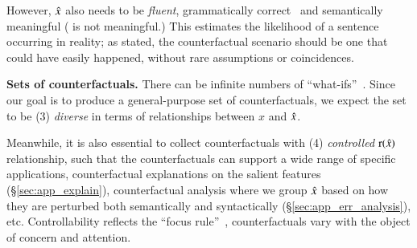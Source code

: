 However, $\hat{x}$ also needs to be \emph{fluent}, \ie grammatically correct~\cite{morris2020textattack} and semantically meaningful (\eg {} is not meaningful.)
This estimates the likelihood of a sentence occurring in reality; as \citet{kahneman} stated, the counterfactual scenario should be one that could have easily happened, without rare assumptions or coincidences. 



\textbf{Sets of counterfactuals.} There can be infinite numbers of ``what-ifs''~\cite{pearl2018causal, kahneman}. %
Since our goal is to produce a general-purpose set of counterfactuals, we expect the set to be (3) \emph{diverse} in terms of relationships between $x$ and $\hat{x}$.

Meanwhile, it is also essential to collect counterfactuals with (4) \emph{controlled} $\operatorname*{r}(\hat{x})$ relationship, such that the counterfactuals can support a wide range of specific applications, \eg counterfactual explanations on the salient features (\S\ref{sec:app_explain}), counterfactual analysis where we group $\hat{x}$ based on how they are perturbed both semantically and syntactically (\S\ref{sec:app_err_analysis}), etc.
Controllability reflects the ``focus rule''~\cite{kahneman}, \ie counterfactuals vary with the object of concern and attention.



